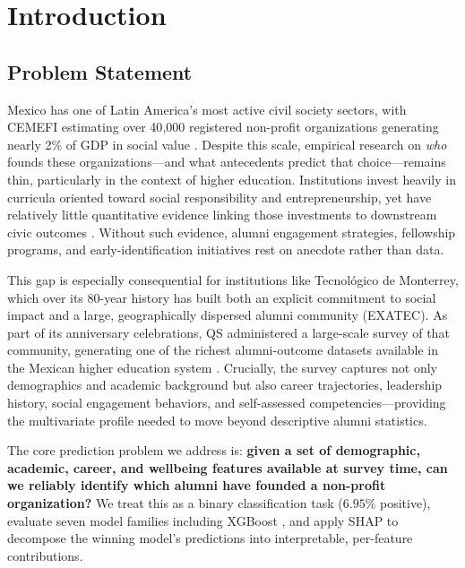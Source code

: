 \documentclass[10pt,twocolumn]{article}
\begin{document}
\section{Introduction}

\subsection{Problem Statement}

Mexico has one of Latin America's most active civil society sectors, with CEMEFI estimating over 40{,}000 registered non-profit organizations generating nearly 2\% of GDP in social value \cite{cemefi2020}. Despite this scale, empirical research on \emph{who} founds these organizations—and what antecedents predict that choice—remains thin, particularly in the context of higher education. Institutions invest heavily in curricula oriented toward social responsibility and entrepreneurship, yet have relatively little quantitative evidence linking those investments to downstream civic outcomes \cite{alnaemi2026}. Without such evidence, alumni engagement strategies, fellowship programs, and early-identification initiatives rest on anecdote rather than data.

This gap is especially consequential for institutions like Tecnológico de Monterrey, which over its 80-year history has built both an explicit commitment to social impact and a large, geographically dispersed alumni community (EXATEC). As part of its anniversary celebrations, QS administered a large-scale survey of that community, generating one of the richest alumni-outcome datasets available in the Mexican higher education system \cite{qs2023}. Crucially, the survey captures not only demographics and academic background but also career trajectories, leadership history, social engagement behaviors, and self-assessed competencies—providing the multivariate profile needed to move beyond descriptive alumni statistics.

The core prediction problem we address is: \textbf{given a set of demographic, academic, career, and wellbeing features available at survey time, can we reliably identify which alumni have founded a non-profit organization?} We treat this as a binary classification task ($6.95\%$ positive), evaluate seven model families including XGBoost \cite{chen2016}, and apply SHAP \cite{lundberg2017} to decompose the winning model's predictions into interpretable, per-feature contributions.
\end{document}
